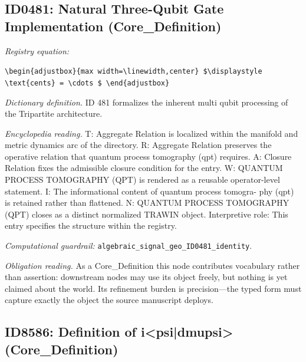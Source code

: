 \documentclass[11pt]{article}
\theoremstyle{remark}
\begin{document}
\subsection{ID0481: Natural Three-Qubit Gate Implementation (Core\_Definition)}

\noindent\textit{Registry equation:}\par
{\small\texttt{\textbackslash{}begin\{adjustbox\}\{max width=\textbackslash{}linewidth,center\} \$\textbackslash{}displaystyle \textbackslash{}text\{cents\} = \textbackslash{}cdots \$ \textbackslash{}end\{adjustbox\}}}\par\medskip
\noindent\textit{Dictionary definition.} ID 481 formalizes the inherent multi qubit processing of the Tripartite architecture.\par\medskip
\noindent\textit{Encyclopedia reading.} T: Aggregate Relation is localized within the manifold and metric dynamics arc of the directory. R: Aggregate Relation preserves the operative relation that quantum process tomography (qpt) requires. A: Closure Relation fixes the admissible closure condition for the entry. W: QUANTUM PROCESS TOMOGRAPHY (QPT) is rendered as a reusable operator-level statement. I: The informational content of quantum process tomogra- phy (qpt) is retained rather than flattened. N: QUANTUM PROCESS TOMOGRAPHY (QPT) closes as a distinct normalized TRAWIN object. Interpretive role: This entry specifies the structure within the registry.
\par\medskip\noindent\textit{Computational guardrail:} \texttt{algebraic\_signal\_geo\_ID0481\_identity}.
\par\medskip\noindent\textit{Obligation reading.} As a Core\_Definition this node contributes vocabulary rather than assertion: downstream nodes may use its object freely, but nothing is yet claimed about the world. Its refinement burden is precision---the typed form must capture exactly the object the source manuscript deploys.

\subsection{ID8586: Definition of i<psi|dmupsi> (Core\_Definition)}
\end{document}
